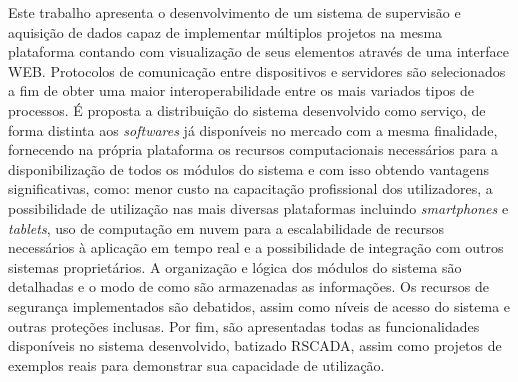 Este trabalho apresenta o desenvolvimento de um sistema de supervisão e aquisição de dados capaz de implementar múltiplos projetos na mesma plataforma contando com visualização de seus elementos através de uma interface WEB. Protocolos de comunicação entre dispositivos e servidores são selecionados a fim de obter uma maior interoperabilidade entre os mais variados tipos de processos. É proposta a distribuição do sistema desenvolvido como serviço, de forma distinta aos \textit{softwares} já disponíveis no mercado com a mesma finalidade, fornecendo na própria plataforma os recursos computacionais necessários para a disponibilização de todos os módulos do sistema e com isso obtendo vantagens significativas, como: menor custo na capacitação profissional dos utilizadores, a possibilidade de utilização nas mais diversas plataformas incluindo \textit{smartphones} e \textit{tablets}, uso de computação em nuvem para a escalabilidade de recursos necessários à aplicação em tempo real e a possibilidade de integração com outros sistemas proprietários. A organização e lógica dos módulos do sistema são detalhadas e o modo de como são armazenadas as informações. Os recursos de segurança implementados são debatidos, assim como níveis de acesso do sistema e outras proteções inclusas. Por fim, são apresentadas todas as funcionalidades disponíveis no sistema desenvolvido, batizado RSCADA, assim como projetos de exemplos reais para demonstrar sua capacidade de utilização.

